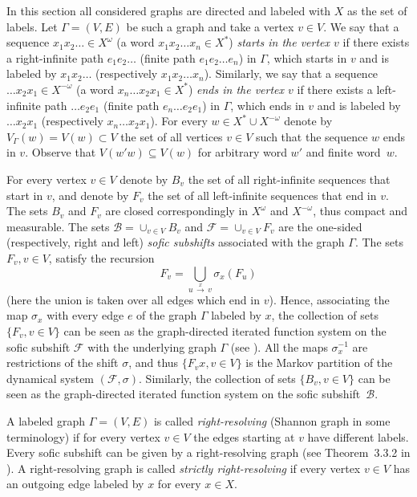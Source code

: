 \documentclass[12pt]{article}
\newcommand{\xmo}{X^{-\omega}}
\newcommand{\xo}{X^\omega}
\newcommand{\gr}{\Gamma}
\newcommand{\B}{\mathscr{B}}
\newcommand{\F}{\mathscr{F}}
\theoremstyle{definition}
\begin{document}
In this section all considered graphs are directed and labeled with $X$ as the set of labels. Let
$\gr=(V,E)$ be such a graph and take a vertex $v\in V$. We say that a sequence $x_1x_2\ldots\in\xo$
(a word $x_1x_2\ldots x_n\in X^{*}$) \textit{starts in the vertex $v$} if there exists a
right-infinite path $e_1e_2\ldots$ (finite path $e_1e_2\ldots e_n$) in $\gr$, which starts in $v$
and is labeled by $x_1x_2\ldots$ (respectively $x_1x_2\ldots x_n$). Similarly, we say that a
sequence $\ldots x_2x_1\in\xmo$ (a word $x_n\ldots x_2x_1\in X^{*}$) \textit{ends in the vertex
$v$} if there exists a left-infinite path $\ldots e_2e_1$ (finite path $e_n\ldots e_2e_1$) in
$\gr$, which ends in $v$ and is labeled by $\ldots x_2x_1$ (respectively $x_n\ldots x_2x_1$). For
every $w\in X^*\cup\xmo$ denote by $V_\gr(w)=V(w)\subset V$ the set of all vertices $v\in V$ such
that the sequence $w$ ends in $v$. Observe that $V(w'w)\subseteq V(w)$ for arbitrary word $w'$ and
finite word~$w$.

For every vertex $v\in V$ denote by $B_v$ the set of all right-infinite sequences that start in
$v$, and denote by $F_v$ the set of all left-infinite sequences that end in $v$. The sets $B_v$ and
$F_v$ are closed correspondingly in $\xo$ and $\xmo$, thus compact and measurable. The sets
$\B=\cup_{v\in V}B_v$ and $\F=\cup_{v\in V}F_v$ are the one-sided (respectively, right and left)
\textit{sofic subshifts} associated with the graph $\gr$. The sets $F_v, v\in V$, satisfy the
recursion
\[
F_v=\bigcup_{u\, \stackrel{x}{\rightarrow} \,v} \sigma_x(F_u)
\]
(here the union is taken over all edges which end in $v$). Hence, associating the map $\sigma_x$
with every edge $e$ of the graph $\gr$ labeled by $x$, the collection of sets $\{F_v, v\in V\}$ can
be seen as the graph-directed iterated function system on the sofic subshift $\F$ with the
underlying graph $\gr$ (see \cite{fractal_gr_sets}). All the maps $\sigma_x^{-1}$  are restrictions
of the shift $\sigma$, and thus $\{F_vx, v\in V\}$ is the Markov partition of the dynamical system
$(\F,\sigma)$. Similarly, the collection of sets $\{B_v, v\in V\}$ can be seen as the
graph-directed iterated function system on the sofic subshift~$\B$.


A labeled graph $\gr=(V,E)$ is called \textit{right-resolving} (Shannon graph in some terminology)
if for every vertex $v\in V$ the edges starting at $v$ have different labels. Every sofic subshift
can be given by a right-resolving graph (see Theorem~3.3.2 in \cite{IntroSymbDyn}). A
right-resolving graph is called \textit{strictly right-resolving} if every vertex $v\in V$ has an
outgoing edge labeled by $x$ for every $x\in X$.
\end{document}
